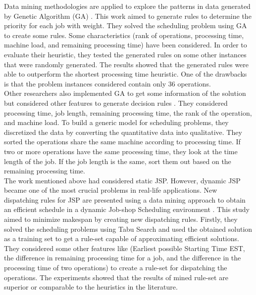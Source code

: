 \documentclass{article}
\begin{document}
Data mining methodologies are applied to explore the patterns in data generated by Genetic Algorithm (GA) \cite{koonce2000using}. This work aimed to generate rules to determine the priority for each job with weight. They solved the scheduling problem using GA to create some rules. Some characteristics (rank of operations, processing time, machine load, and remaining processing time) have been considered. In order to evaluate their heuristic, they tested the generated rules on some other instances that were randomly generated. The results showed that the generated rules were able to outperform the shortest processing time heuristic. One of the drawbacks is that the problem instances considered contain only 36 operations.\\

Other researchers also implemented GA to get some information of the solution but considered other features to generate decision rules \cite{harrath2002genetic}. They considered processing time, job length, remaining processing time, the rank of the operation, and machine load. To build a generic model for scheduling problems, they discretized the data by converting the quantitative data into qualitative. They sorted the operations share the same machine according to processing time. If two or more operations have the same processing time, they look at the time length of the job. If the job length is the same, sort them out based on the remaining processing time.\\

The work mentioned above had considered static JSP. However, dynamic JSP became one of the most crucial problems in real-life applications. New dispatching rules for JSP are presented using a data mining approach to obtain an efficient schedule in a dynamic Job-shop Scheduling environment \cite{shahzad2010discovering}. This study aimed to minimize makespan by creating new dispatching rules. Firstly, they solved the scheduling problems using Tabu Search and used the obtained solution as a training set to get a rule-set capable of approximating efficient solutions. They considered some other features like (Earliest possible Starting Time EST, the difference in remaining processing time for a job, and the difference in the processing time of two operations) to create a rule-set for dispatching the operations. The experiments showed that the results of mined rule-set are superior or comparable to the heuristics in the literature.\\
\end{document}
